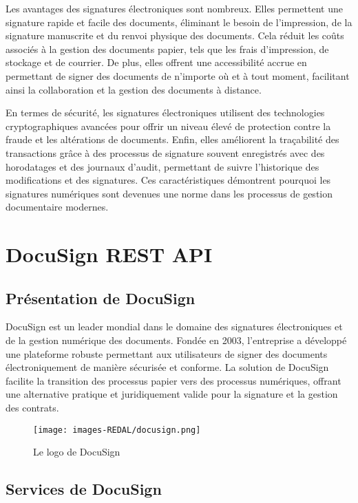 Les avantages des signatures électroniques sont nombreux. Elles permettent une signature rapide et facile des documents, éliminant le besoin de l'impression, de la signature manuscrite et du renvoi physique des documents. Cela réduit les coûts associés à la gestion des documents papier, tels que les frais d'impression, de stockage et de courrier. De plus, elles offrent une accessibilité accrue en permettant de signer des documents de n'importe où et à tout moment, facilitant ainsi la collaboration et la gestion des documents à distance.

En termes de sécurité, les signatures électroniques utilisent des technologies cryptographiques avancées pour offrir un niveau élevé de protection contre la fraude et les altérations de documents. Enfin, elles améliorent la traçabilité des transactions grâce à des processus de signature souvent enregistrés avec des horodatages et des journaux d'audit, permettant de suivre l'historique des modifications et des signatures. Ces caractéristiques démontrent pourquoi les signatures numériques sont devenues une norme dans les processus de gestion documentaire modernes.



\section{DocuSign REST API}

\subsection{Présentation de DocuSign}
DocuSign est un leader mondial dans le domaine des signatures électroniques et de la gestion numérique des documents. Fondée en 2003, l’entreprise a développé une plateforme robuste permettant aux utilisateurs de signer des documents électroniquement de manière sécurisée et conforme. La solution de DocuSign facilite la transition des processus papier vers des processus numériques, offrant une alternative pratique et juridiquement valide pour la signature et la gestion des contrats.


\begin{figure}[H]
\begin{center}
\texttt{[image: images-REDAL/docusign.png]}
\end{center}
\caption{Le logo de DocuSign}
\end{figure}


\subsection{Services de DocuSign}

